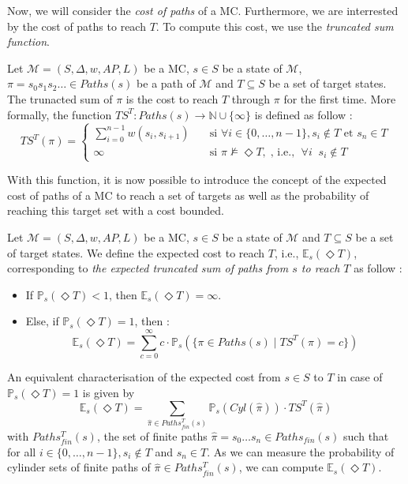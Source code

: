 Now, we will consider the \textit{cost of paths} of a MC. Furthermore, we
are interrested by the cost of paths to reach $T$. To compute this cost, we use the \textit{truncated sum function}.

\begin{definition}
  Let $\mathcal{M}=(S, \Delta, w, AP, L)$ be a MC, $s \in S$ be a state of $\mathcal{M}$, $\pi = s_0s_1s_2\dots \in Paths(s)$ be a path of $\mathcal{M}$ and $T \subseteq S$ be a set of target states.
  The trunacted sum of $\pi$ is the cost to reach $T$ through $\pi$
  for the first time. More formally, the function $TS^T : Paths(s) \rightarrow \mathbb{N} \cup \{\infty\}$ is defined as follow :
	\[
		TS^T(\pi) =
		\begin{cases}
			\sum_{i = 0}^{n-1} w(s_i, s_{i+1}) & \quad \text{si } \forall i \in \{0, \dots, n - 1\}, s_i \not\in T \text{ et } s_n \in T \\
			\infty & \quad \text{si } \pi \not \models \Diamond T,\; \text{, i.e., } \; \forall i \;\; s_i \notin T
		\end{cases}
	\]
\end{definition}
With this function, it is now possible to introduce the concept of the
expected cost of paths of a MC to reach a set of targets as well as
the probability of reaching this target set with a cost bounded.

\begin{definition}
	Let $\mathcal{M} = (S, \Delta, w, AP, L)$ be a MC, $s \in S$ be a state of $\mathcal{M}$ and $T \subseteq S$ be a set of target states. We define the expected cost to reach $T$, i.e., $\mathbb{E}_s(\Diamond T)$, corresponding to \textit{the expected truncated sum of paths from $s$ to reach $T$} as follow :
	\begin{itemize}
	\renewcommand{\labelitemi}{\tiny$\bullet$}
	\item If $\mathbb{P}_s(\Diamond T) < 1$, then $\mathbb{E}_s(\Diamond T) = \infty$.%
	\item Else, if $\mathbb{P}_s(\Diamond T) = 1$, then :
	\[
    \mathbb{E}_s(\Diamond T) = \sum_{c = 0}^\infty c \cdot \mathbb{P}_s(\{\pi \in Paths(s) \; | \; TS^T(\pi) = c \})
  \]
	\end{itemize}
\end{definition}

An equivalent characterisation of the expected cost from $s \in S$ to $T$ in case of $\mathbb{P}_s(\Diamond T) = 1$ is given by
\[
  \mathbb{E}_s(\Diamond T) = \sum_{\hat{\pi} \in Paths_{fin}^T(s)} \mathbb{P}_s(Cyl(\hat{\pi})) \cdot TS^T(\hat{\pi})
\]
with $Paths^T_{fin}(s)$, the set of finite paths $\hat{\pi} = s_0 \dots s_n \in Paths_{fin}(s)$  such that for all $i \in \{0, \dots, n-1\}, s_i \not \in T$ and $s_n \in T$. As we can measure the probability of cylinder sets of finite paths of $\hat{\pi} \in Paths_{fin}^T(s)$, we can compute $\mathbb{E}_s(\Diamond T)$.

